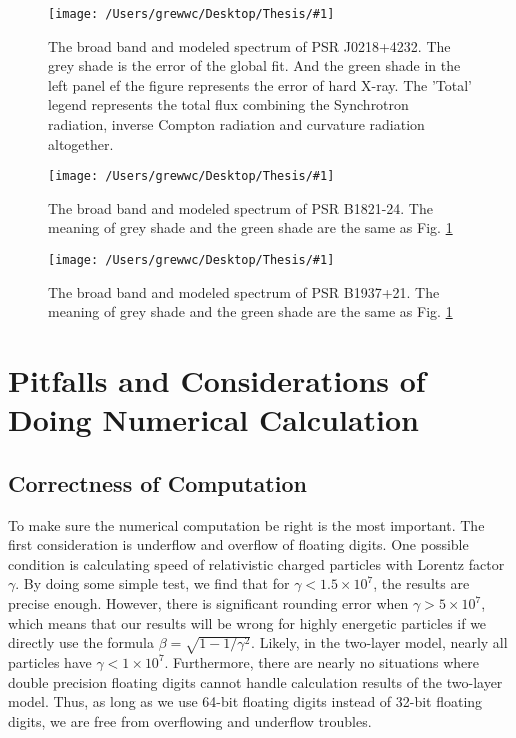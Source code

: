 \documentclass[12pt]{report}
\newcommand{\mycaption}[1]{\protect \caption{#1}}
\newcommand{\singleFig}[3]{
 \begin{figure}[!ht]
  \centering
  \texttt{[image: /Users/grewwc/Desktop/Thesis/\#1]}
  \mycaption{#3}
 \label{fig: #1}
 \end{figure}
}
\begin{document}
        \singleFig{j0218_twolayer_all.png}{0.39}{The broad band and modeled spectrum of PSR J0218+4232.
          The grey shade is the error of the global fit. And the green shade in the left panel ef the 
          figure represents the error of hard X-ray. The 'Total' legend represents the total flux 
          combining the Synchrotron radiation, inverse Compton radiation and curvature radiation
          altogether.}
        \vspace{0.5cm} 
        
        \singleFig{b1821_twolayer_all.png}{0.4}{The broad band and modeled spectrum of PSR B1821-24.
          The meaning of grey shade and the green shade are the same as Fig.
          \ref{fig: j0218_twolayer_all.png}}
        \vspace{0.5cm} 
          
        \singleFig{j1939_twolayer_all.png}{0.39}{The broad band and modeled spectrum of PSR B1937+21.
          The meaning of grey shade and the green shade are the same as Fig.
          \ref{fig: j0218_twolayer_all.png}}
        \vspace{0.5cm}
        
      \section{Pitfalls and Considerations of Doing Numerical Calculation}
        \subsection{Correctness of Computation}
          To make sure the numerical computation be right is the most important. 
          The first consideration is underflow and overflow of floating digits.
          One possible condition is calculating speed of relativistic charged particles with 
          Lorentz factor $\gamma$. By doing some simple test, we find that for 
          $\gamma < 1.5\times 10^7$, the results are precise enough. However, there is significant rounding error
          when $\gamma > 5\times 10^7$, which means that our results will be wrong for highly 
          energetic particles if we directly use the formula $\beta = \sqrt{1 - 1/\gamma^2}$.
          Likely, in the two-layer model, nearly all particles have $\gamma < 1\times 10^7$. 
          Furthermore, there are nearly no situations where double precision floating digits
          cannot handle calculation results of the two-layer model. Thus, as long as we use 
          64-bit floating digits instead of 32-bit floating digits, we are free from overflowing and 
          underflow troubles. 
            
\end{document}

